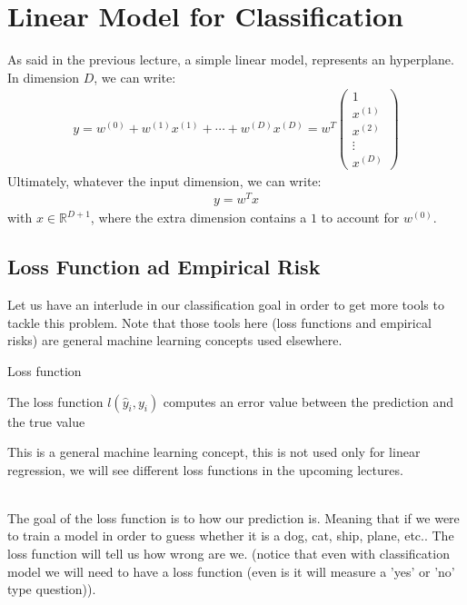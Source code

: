 \section{Linear Model for Classification}

As said in the previous lecture, a simple linear model, represents an hyperplane. In dimension $D$, we can write:
\begin{align*} 
	y = w^{\left(0\right)} + w^{\left(1\right)}x^{\left(1\right)} + \cdots + w^{\left(D\right)}x^{\left(D\right)} = w^{T}\begin{pmatrix} 1 \\ x^{\left(1\right)} \\ x^{\left(2\right)} \\ \vdots \\ x^{\left(D\right)} \end{pmatrix} 
\end{align*}
Ultimately, whatever the input dimension, we can write:
\begin{align*} 
	y = w^{T}x
\end{align*}
with $x \in \mathbb{R}^{D + 1}$, where the extra dimension contains a $1$ to account for $w^{\left(0\right)}$.
\subsection{Loss Function ad Empirical Risk}
Let us have an interlude in our classification goal in order to get more tools to tackle this problem. Note that those tools here (loss functions and empirical risks) are general machine learning concepts used elsewhere.

\begin{parag}{Loss function}
    \begin{definition}
    The loss function $l\left(\hat{y}_i, y_i\right)$ computes an error value between the prediction and the true value
    \end{definition}
	This is a general machine learning concept, this is not used only for linear regression, we will see different loss functions in the upcoming lectures.
\end{parag}
$ $\\
The goal of the loss function is to  how  our prediction is. Meaning that if we were to train a model in order to guess whether it is a dog, cat, ship, plane, etc.. The loss function will tell us how wrong are we. (notice that even with classification model we will need to have a loss function (even is it will measure a 'yes' or 'no' type question)).

